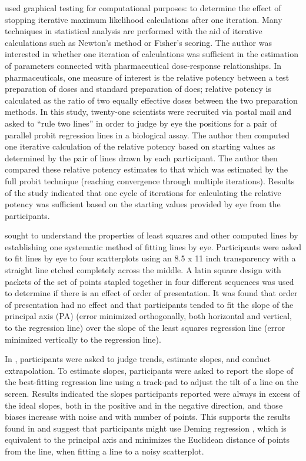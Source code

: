 \documentclass[12pt]{article}
\begin{document}
\citet{finney1951subjective} used graphical testing for computational
purposes: to determine the effect of stopping iterative maximum
likelihood calculations after one iteration. Many techniques in
statistical analysis are performed with the aid of iterative
calculations such as Newton's method or Fisher's scoring. The author was
interested in whether one iteration of calculations was sufficient in
the estimation of parameters connected with pharmaceutical dose-response
relationships. In pharmaceuticals, one measure of interest is the
relative potency between a test preparation of doses and standard
preparation of does; relative potency is calculated as the ratio of two
equally effective doses between the two preparation methods. In this
study, twenty-one scientists were recruited via postal mail and asked to
``rule two lines'' in order to judge by eye the positions for a pair of
parallel probit regression lines in a biological assay. The author then
computed one iterative calculation of the relative potency based on
starting values as determined by the pair of lines drawn by each
participant. The author then compared these relative potency estimates
to that which was estimated by the full probit technique (reaching
convergence through multiple iterations). Results of the study indicated
that one cycle of iterations for calculating the relative potency was
sufficient based on the starting values provided by eye from the
participants.

\citet{mosteller1981eye} sought to understand the properties of least
squares and other computed lines by establishing one systematic method
of fitting lines by eye. Participants were asked to fit lines by eye to
four scatterplots using an 8.5 x 11 inch transparency with a straight
line etched completely across the middle. A latin square design with
packets of the set of points stapled together in four different
sequences was used to determine if there is an effect of order of
presentation. It was found that order of presentation had no effect and
that participants tended to fit the slope of the principal axis (PA)
(error minimized orthogonally, both horizontal and vertical, to the
regression line) over the slope of the least squares regression line
(error minimized vertically to the regression line).

In \citet{ciccione2021can}, participants were asked to judge trends,
estimate slopes, and conduct extrapolation. To estimate slopes,
participants were asked to report the slope of the best-fitting
regression line using a track-pad to adjust the tilt of a line on the
screen. Results indicated the slopes participants reported were always
in excess of the ideal slopes, both in the positive and in the negative
direction, and those biases increase with noise and with number of
points. This supports the results found in \citet{mosteller1981eye} and
suggest that participants might use Deming regression
\citep{deming1943statistical, linnet1998performance, martin2000general},
which is equivalent to the principal axis and minimizes the Euclidean
distance of points from the line, when fitting a line to a noisy
scatterplot.
\end{document}
